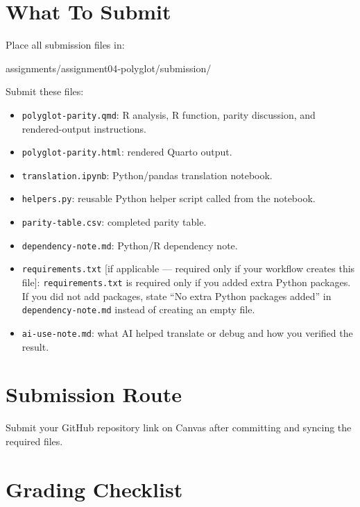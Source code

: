 \documentclass[
  letterpaper,
  DIV=11,
  numbers=noendperiod,
  oneside]{scrreprt}
\newenvironment{Shaded}{\begin{snugshade}}{\end{snugshade}}
\newcommand{\NormalTok}[1]{\textcolor[rgb]{0.00,0.23,0.31}{#1}}
\providecommand{\tightlist}{%
  \setlength{\itemsep}{0pt}\setlength{\parskip}{0pt}}
\begin{document}
\section{What To Submit}\label{what-to-submit-3}

Place all submission files in:

\begin{Shaded}
\begin{Highlighting}[numbers=left,,]
\NormalTok{assignments/assignment04{-}polyglot/submission/}
\end{Highlighting}
\end{Shaded}

Submit these files:

\begin{itemize}
\tightlist
\item
  \texttt{polyglot-parity.qmd}: R analysis, R function, parity
  discussion, and rendered-output instructions.
\item
  \texttt{polyglot-parity.html}: rendered Quarto output.
\item
  \texttt{translation.ipynb}: Python/pandas translation notebook.
\item
  \texttt{helpers.py}: reusable Python helper script called from the
  notebook.
\item
  \texttt{parity-table.csv}: completed parity table.
\item
  \texttt{dependency-note.md}: Python/R dependency note.
\item
  \texttt{requirements.txt} {[}if applicable --- required only if your
  workflow creates this file{]}: \texttt{requirements.txt} is required
  only if you added extra Python packages. If you did not add packages,
  state ``No extra Python packages added'' in
  \texttt{dependency-note.md} instead of creating an empty file.
\item
  \texttt{ai-use-note.md}: what AI helped translate or debug and how you
  verified the result.
\end{itemize}

\section{Submission Route}\label{submission-route-3}

Submit your GitHub repository link on Canvas after committing and
syncing the required files.

\section{Grading Checklist}\label{grading-checklist-3}
\end{document}
